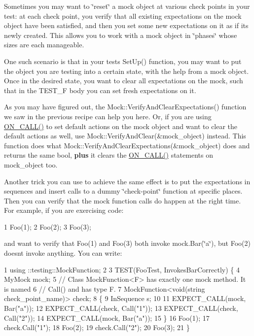 Sometimes you may want to \char`\"{}reset\char`\"{} a mock object at various check points in your test\+: at each check point, you verify that all existing expectations on the mock object have been satisfied, and then you set some new expectations on it as if it\textquotesingle{}s newly created. This allows you to work with a mock object in \char`\"{}phases\char`\"{} whose sizes are each manageable.

One such scenario is that in your test\textquotesingle{}s {\ttfamily Set\+Up()} function, you may want to put the object you are testing into a certain state, with the help from a mock object. Once in the desired state, you want to clear all expectations on the mock, such that in the {\ttfamily T\+E\+S\+T\+\_\+F} body you can set fresh expectations on it.

As you may have figured out, the {\ttfamily Mock\+::\+Verify\+And\+Clear\+Expectations()} function we saw in the previous recipe can help you here. Or, if you are using {\ttfamily \hyperlink{gmock-spec-builders_8h_a5b12ae6cf84f0a544ca811b380c37334}{O\+N\+\_\+\+C\+A\+L\+L()}} to set default actions on the mock object and want to clear the default actions as well, use {\ttfamily Mock\+::\+Verify\+And\+Clear(\&mock\+\_\+object)} instead. This function does what {\ttfamily Mock\+::\+Verify\+And\+Clear\+Expectations(\&mock\+\_\+object)} does and returns the same {\ttfamily bool}, {\bfseries plus} it clears the {\ttfamily \hyperlink{gmock-spec-builders_8h_a5b12ae6cf84f0a544ca811b380c37334}{O\+N\+\_\+\+C\+A\+L\+L()}} statements on {\ttfamily mock\+\_\+object} too.

Another trick you can use to achieve the same effect is to put the expectations in sequences and insert calls to a dummy \char`\"{}check-\/point\char`\"{} function at specific places. Then you can verify that the mock function calls do happen at the right time. For example, if you are exercising code\+:


\begin{DoxyCode}
1 Foo(1);
2 Foo(2);
3 Foo(3);
\end{DoxyCode}


and want to verify that {\ttfamily Foo(1)} and {\ttfamily Foo(3)} both invoke {\ttfamily mock.\+Bar(\char`\"{}a\char`\"{})}, but {\ttfamily Foo(2)} doesn\textquotesingle{}t invoke anything. You can write\+:


\begin{DoxyCode}
1 using ::testing::MockFunction;
2 
3 TEST(FooTest, InvokesBarCorrectly) \{
4   MyMock mock;
5   // Class MockFunction<F> has exactly one mock method.  It is named
6   // Call() and has type F.
7   MockFunction<void(string check\_point\_name)> check;
8   \{
9     InSequence s;
10 
11     EXPECT\_CALL(mock, Bar("a"));
12     EXPECT\_CALL(check, Call("1"));
13     EXPECT\_CALL(check, Call("2"));
14     EXPECT\_CALL(mock, Bar("a"));
15   \}
16   Foo(1);
17   check.Call("1");
18   Foo(2);
19   check.Call("2");
20   Foo(3);
21 \}
\end{DoxyCode}


